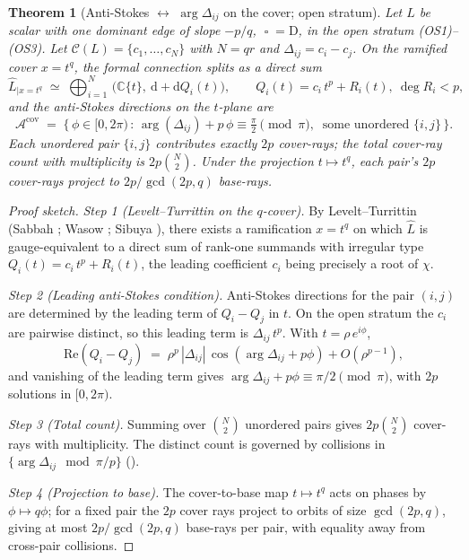 \documentclass[11pt,a4paper]{article}
\theoremstyle{plain}
\newtheorem{theorem}{Theorem}[section]
\theoremstyle{definition}
\theoremstyle{remark}
\newcommand{\op}{\mathop{\square}}                %
\newcommand{\opD}{\mathrm{D}}                     %
\newcommand{\Cl}{\mathcal{C}}
\newcommand{\Acov}{\mathcal{A}^{\mathrm{cov}}}
\newcommand{\Dij}{\Delta_{ij}}
\DeclareMathOperator{\arginline}{arg}
\begin{document}
\begin{theorem}[Anti-Stokes $\leftrightarrow$ $\arginline \Dij$ on the
cover; open stratum]\label{thm:AT1}
Let $L$ be scalar with one dominant edge of slope $-p/q$, $\op = \opD$, in
the open stratum (OS1)--(OS3). Let $\Cl(L) = \{c_1, \dots, c_N\}$ with
$N = qr$ and $\Dij = c_i - c_j$. On the ramified cover $x = t^q$, the
formal connection splits as a direct sum
\[
   \widehat{L}_{|x = t^q}
   \;\simeq\;
   \bigoplus_{i = 1}^{N}\,
   \big(\mathbb{C}\{t\},\ \mathrm{d} + \mathrm{d} Q_i(t)\big),
   \qquad Q_i(t) = c_i\, t^p + R_i(t),\ \deg R_i < p,
\]
and the anti-Stokes directions on the $t$-plane are
\[
   \Acov
   \;=\;
   \big\{\, \phi \in [0, 2\pi)\, :\,
   \arginline(\Dij) + p\, \phi \equiv \tfrac{\pi}{2} \pmod{\pi},\
   \text{ some unordered } \{i, j\} \,\big\}.
\]
Each unordered pair $\{i, j\}$ contributes exactly $2p$ cover-rays; the
total cover-ray count with multiplicity is $2 p \binom{N}{2}$. Under the
projection $t \mapsto t^q$, each pair's $2p$ cover-rays project to
$2p / \gcd(2p, q)$ base-rays.
\end{theorem}

\begin{proof}[Proof sketch]
\textit{Step 1 (Levelt--Turrittin on the $q$-cover).} By Levelt--Turrittin
(Sabbah \cite[Ch.~II]{sabbah-isomon}; Wasow \cite[Ch.~VII]{wasow};
Sibuya \cite{sibuya}), there exists a ramification $x = t^q$ on which
$\widehat{L}$ is gauge-equivalent to a direct sum of rank-one summands
with irregular type $Q_i(t) = c_i\, t^p + R_i(t)$, the leading coefficient
$c_i$ being precisely a root of $\chi$.

\textit{Step 2 (Leading anti-Stokes condition).} Anti-Stokes directions
for the pair $(i, j)$ are determined by the leading term of $Q_i - Q_j$
in $t$. On the open stratum the $c_i$ are pairwise distinct, so this
leading term is $\Dij\, t^p$. With $t = \rho\, e^{i\phi}$,
\[
   \mathrm{Re}(Q_i - Q_j)
   \;=\;
   \rho^p\, |\Dij|\, \cos(\arginline \Dij + p \phi) + O(\rho^{p-1}),
\]
and vanishing of the leading term gives $\arginline \Dij + p \phi \equiv
\pi/2 \pmod{\pi}$, with $2p$ solutions in $[0, 2\pi)$.

\textit{Step 3 (Total count).} Summing over $\binom{N}{2}$ unordered pairs
gives $2 p \binom{N}{2}$ cover-rays with multiplicity. The distinct count
is governed by collisions in $\{\arginline \Dij \mod \pi/p\}$
(\cite[phase3\_invariants.json: D1 partition]{wkb_dataset_v1}).

\textit{Step 4 (Projection to base).} The cover-to-base map $t \mapsto t^q$
acts on phases by $\phi \mapsto q\phi$; for a fixed pair the $2p$ cover
rays project to orbits of size $\gcd(2p, q)$, giving at most $2p /
\gcd(2p, q)$ base-rays per pair, with equality away from cross-pair
collisions.
\end{proof}
\end{document}
